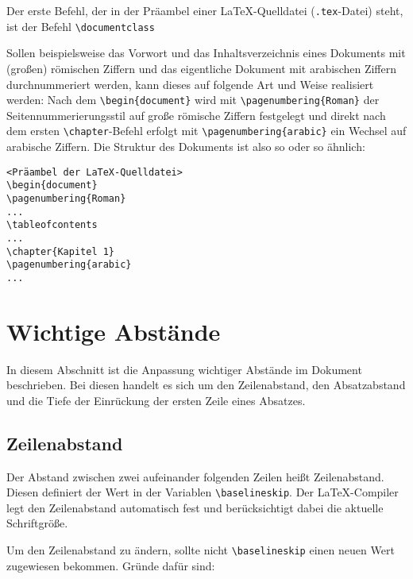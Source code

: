 Der erste Befehl, der in der Präambel einer \LaTeX-Quelldatei (\verb!.tex!-Datei) steht, ist der Befehl \verb!\documentclass!
\begin{document}


Sollen beispielsweise das Vorwort und das Inhaltsverzeichnis eines Dokuments mit (großen) römischen Ziffern 
und das eigentliche 
Dokument mit arabischen Ziffern durchnummeriert werden, kann dieses auf folgende Art und Weise realisiert werden: 
Nach dem \verb!\begin{document}! wird mit \verb!\pagenumbering{Roman}! der 
Seitennummerierungsstil auf große römische Ziffern festgelegt und direkt nach 
dem ersten \texttt{\textbackslash chapter}-Befehl erfolgt mit \verb!\pagenumbering{arabic}! ein Wechsel 
auf arabische Ziffern. Die Struktur des Dokuments ist also so oder so ähnlich:


\begin{Verbatim}[frame=single]
<Präambel der LaTeX-Quelldatei>
\begin{document}
\pagenumbering{Roman}
...
\tableofcontents
...
\chapter{Kapitel 1}
\pagenumbering{arabic}
...
\end{Verbatim}




\section{Wichtige Abstände}

In diesem Abschnitt ist die Anpassung wichtiger Abstände im Dokument beschrieben. Bei diesen handelt es sich um den Zeilenabstand, den Absatzabstand und die Tiefe der Einrückung der ersten Zeile eines Absatzes.


\subsection{Zeilenabstand}

Der Abstand zwischen zwei aufeinander 
folgenden Zeilen heißt 
Zeilenabstand. Diesen definiert der Wert in der 
Variablen \verb!\baselineskip!.
Der \LaTeX-Compiler legt den Zeilenabstand 
automatisch fest und berücksichtigt dabei die
aktuelle Schriftgröße. 

Um den Zeilenabstand zu ändern, sollte nicht \verb!\baselineskip! einen neuen Wert zugewiesen bekommen. Gründe dafür sind:
\end{document}
